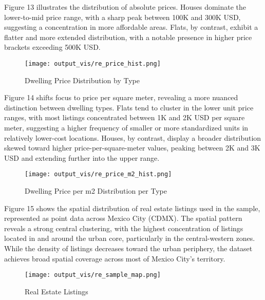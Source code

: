\documentclass[
  12pt,
]{report}
\begin{document}
Figure 13 illustrates the distribution of absolute prices. Houses
dominate the lower-to-mid price range, with a sharp peak between 100K
and 300K USD, suggesting a concentration in more affordable areas.
Flats, by contrast, exhibit a flatter and more extended distribution,
with a notable presence in higher price brackets exceeding 500K USD.

\begin{figure}[H]

{\centering \texttt{[image: output\_vis/re\_price\_hist.png]}

}

\caption{Dwelling Price Distribution by Type}

\end{figure}%

Figure 14 shifts focus to price per square meter, revealing a more
nuanced distinction between dwelling types. Flats tend to cluster in the
lower unit price ranges, with most listings concentrated between 1K and
2K USD per square meter, suggesting a higher frequency of smaller or
more standardized units in relatively lower-cost locations. Houses, by
contrast, display a broader distribution skewed toward higher
price-per-square-meter values, peaking between 2K and 3K USD and
extending further into the upper range.

\begin{figure}[H]

{\centering \texttt{[image: output\_vis/re\_price\_m2\_hist.png]}

}

\caption{Dwelling Price per m2 Distribution per Type}

\end{figure}%

Figure 15 shows the spatial distribution of real estate listings used in
the sample, represented as point data across Mexico City (CDMX). The
spatial pattern reveals a strong central clustering, with the highest
concentration of listings located in and around the urban core,
particularly in the central-western zones. While the density of listings
decreases toward the urban periphery, the dataset achieves broad spatial
coverage across most of Mexico City's territory.

\begin{figure}[H]

{\centering \texttt{[image: output\_vis/re\_sample\_map.png]}

}

\caption{Real Estate Listings}

\end{figure}%
\end{document}
